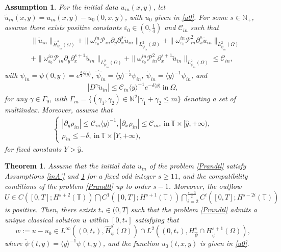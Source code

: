 \documentclass[10pt,a4paper]{amsart}
\newtheorem{assumption}{Assumption}
\newtheorem{theorem}{Theorem}
\newcommand\y{{{\langle y \rangle}}}
\begin{document}
\begin{assumption}\label{inA}
For the initial data $u_{in}(x,y)$, let $\tilde{u}_{in}(x,y)=u_{in}(x,y)-u_{0}(0,x,y)$, with $u_0$ given in \eqref{u0}.
For some $s\in\mathbb{N}_{+}$, assume there exists positive constants $\varepsilon_{0}\in\left(0,\frac{1}{4}\right)$ and $\mathcal{C}_{in}$ such that
\begin{align}\label{inA4}
&\|\tilde{u}_{in}\|_{\hat{H}_{\psi_{in}}^{s}(\Omega)}
+\|\omega_{\varepsilon_{0}}^{in}\mathcal{P}_{in}\partial_{y}\partial_{x}^{s}\tilde{u}_{in}\|_{L_{\hat{\psi}_{in}}^{2}(\Omega)}
+\|\omega_{\varepsilon_{0}}^{in}\mathcal{P}_{in}^{2}\partial_{x}^{s}\tilde{u}_{in}\|_{L_{\hat{\psi}_{in}}^{2}(\Omega)}\\
&+\|\omega_{\varepsilon_{0}}^{in}\mathcal{P}_{in}\partial_{y}\partial_{x}^{s+1}\tilde{u}_{in}\|_{L_{\check{\psi}_{in}}^{2}(\Omega)}
+\|\omega_{\varepsilon_{0}}^{in}\mathcal{P}_{in}^{2}\partial_{x}^{s+1}\tilde{u}_{in}\|_{L_{\check{\psi}_{in}}^{2}(\Omega)}
\leq \mathcal{C}_{in},\nonumber
\end{align}
with $\psi_{in}=\psi(0,y)=e^{\frac{3}{4}\delta\y}$, $\hat{\psi}_{in}=\y^{-\frac{1}{2}} \psi_{in}$, $\check{\psi}_{in}=\y^{-1} \psi_{in}$,
and
\begin{align}\label{inA5}
|D^{\gamma}\tilde{u}_{in}|\leq \mathcal{C}_{in}\y^{-1}e^{-\delta\y}~\text{in}~\Omega,
\end{align}
for any $\gamma\in\Gamma_{9}$, with $\Gamma_{m}=\{(\gamma_{1},\gamma_{2})\in\mathbb{N}^{2}| \gamma_{1}+\gamma_{2}\leq m\}$  denoting a set of multiindex. Moreover, assume that
\begin{align}\label{inA6}
\begin{cases}
|\partial_{y}\rho_{in}|\leq \mathcal{C}_{in}\y^{-1}, |\partial_{x}\rho_{in}|\leq \mathcal{C}_{in},~\text{in}~\mathbb{T}\times[\hat{y},+\infty),\\
\rho_{in}\leq -\delta,~\text{in}~\mathbb{T}\times[Y,+\infty),
\end{cases}
\end{align}
for fixed constants $Y>\hat{y}$.


\end{assumption}

\begin{theorem}\label{MR}
Assume that the initial data $u_{in}$ of the problem \eqref{Prandtl} satisfy  Assumptions \ref{inA'} and \ref{inA} for  a fixed odd integer $s\geq 11$, and the compatibility conditions of the problem \eqref{Prandtl} up to order $s-1$. Moreover, the outflow
$U\in C([0,T];H^{s+2}(\mathbb{T}))\bigcap C^{1}([0,T];H^{s+1}(\mathbb{T}))\bigcap\limits_{i=2}^{\frac{s-3}{2}}C^{i}([0,T];H^{s-2i}(\mathbb{T}))$ is positive.
Then, there exists $t_{*}\in(0,T]$ such that the problem \eqref{Prandtl} admits a unique classical solution $u$ within $[0,t_{*}]$ satisfying that
$$w:=u-u_{0}\in L^{\infty}((0, t_{*}), \hat{H}_{\psi}^{s}(\Omega))\cap L^{2}((0, t_{*}), H_{\hat{\psi}}^{s}\cap H_{\check{\psi}}^{s+1}(\Omega)),$$
where $ \check{\psi}(t,y)=\y^{-1}\psi(t,y)$, and the function $u_0(t,x,y)$ is given in \eqref{u0}.
\end{theorem}
\end{document}
